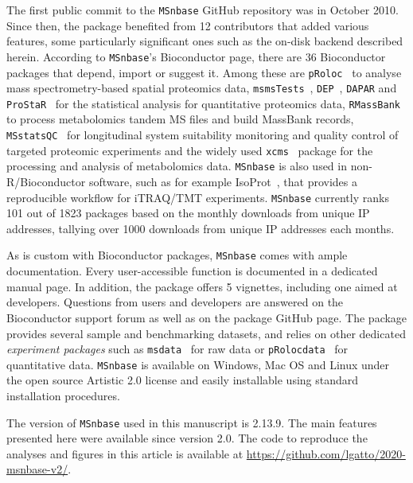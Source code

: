 \documentclass[journal=jacsat,manuscript=article]{achemso}\usepackage[]{graphicx}\usepackage[]{color}
\begin{document}
The first public commit to the \texttt{MSnbase} GitHub repository was
in October 2010. Since then, the package benefited from 12
contributors\cite{contribs} that added various features, some
particularly significant ones such as the on-disk backend described
herein. According to \texttt{MSnbase}'s Bioconductor page, there are
36 Bioconductor packages that depend, import or suggest it. Among
these are \texttt{pRoloc}~\cite{Gatto:2014a} to analyse mass
spectrometry-based spatial proteomics data,
\texttt{msmsTests}~\cite{msmsTests}, \texttt{DEP}~\cite{Zhang:2018},
\texttt{DAPAR} and \texttt{ProStaR}~\cite{Wieczorek:2017} for the
statistical analysis for quantitative proteomics data,
\texttt{RMassBank}~\cite{Stravs:2013} to process metabolomics tandem
MS files and build MassBank records,
\texttt{MSstatsQC}~\cite{Dogu:2017} for longitudinal system
suitability monitoring and quality control of targeted proteomic
experiments and the widely used \texttt{xcms}~\cite{Smith:2006} package
for the processing and analysis of metabolomics data. \texttt{MSnbase}
is also used in non-R/Bioconductor software, such as for example
IsoProt~\cite{Griss:2019}, that provides a reproducible workflow for
iTRAQ/TMT experiments. \texttt{MSnbase} currently ranks 101 out of
1823 packages based on the monthly downloads from unique IP addresses,
tallying over 1000 downloads from unique IP addresses each months.

As is custom with Bioconductor packages, \texttt{MSnbase} comes with
ample documentation. Every user-accessible function is documented in a
dedicated manual page. In addition, the package offers 5 vignettes,
including one aimed at developers. Questions from users and developers
are answered on the Bioconductor support forum as well as on the
package GitHub page. The package provides several sample and
benchmarking datasets, and relies on other dedicated
\textit{experiment packages} such as \texttt{msdata}~\cite{msdata} for
raw data or \texttt{pRolocdata}~\cite{Gatto:2014a} for quantitative
data. \texttt{MSnbase} is available on Windows, Mac OS and Linux under
the open source Artistic 2.0 license and easily installable using
standard installation procedures.




The version of \texttt{MSnbase} used in this manuscript is
2.13.9. The main features presented here were available since
version 2.0. The code to reproduce the analyses and figures in this
article is available at
\url{https://github.com/lgatto/2020-msnbase-v2/}.
\end{document}
